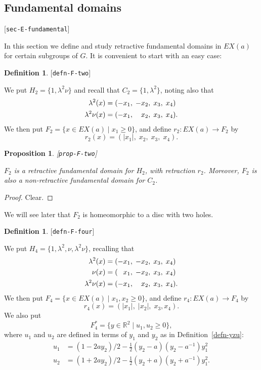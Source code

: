 \documentclass[reqno]{amsart}
\newcommand{\lbl}[1]{\label{#1}\textup{[\texttt{#1}]}\par}
\newcommand{\lbl}{\label}
\newcommand{\lm}        {\lambda}
\newcommand{\R}         {{\mathbb{R}}}
\newcommand{\st}        {\;|\;}
\newcommand{\half}      {\tfrac{1}{2}}
\newcommand{\pp}        {\hphantom{+}}
\renewcommand{\:}{\colon}
\newtheorem{proposition}[theorem]{Proposition}
\theoremstyle{definition}
\newtheorem{definition}[theorem]{Definition}
\begin{document}
\subsection{Fundamental domains}
\lbl{sec-E-fundamental}

In this section we define and study retractive fundamental domains in
$EX(a)$ for certain subgroups of $G$.  It is convenient to start with
an easy case:
\begin{definition}\lbl{defn-F-two}
 We put $H_2=\{1,\lm^2\nu\}$ and recall that $C_2=\{1,\lm^2\}$, noting
 also that
 \begin{align*}
  \lm^2(x)    &= (-x_1,\;-x_2,\;x_3,\;x_4) \\
  \lm^2\nu(x) &= (-x_1,\;\pp x_2,\;x_3,\;x_4).
 \end{align*}
 We then put $F_2=\{x\in EX(a)\st x_1\geq 0\}$, and define
 $r_2\:EX(a)\to F_2$ by
 \[ r_2(x) = (|x_1|,\;x_2,\;x_3,\;x_4). \]
\end{definition}
\begin{proposition}\lbl{prop-F-two}
 $F_2$ is a retractive fundamental domain for $H_2$, with retraction
 $r_2$.  Moreover, $F_2$ is also a non-retractive fundamental domain
 for $C_2$.
\end{proposition}
\begin{proof}
 Clear.
\end{proof}

We will see later that $F_2$ is homeomorphic to a disc with two holes.

\begin{definition}\lbl{defn-F-four}
 We put $H_4=\{1,\lm^2,\nu,\lm^2\nu\}$, recalling that
 \begin{align*}
  \lm^2(x)    &= (-x_1,\;-x_2,\;x_3,\;x_4) \\
  \nu(x)      &= (\pp x_1,\;-x_2,\;x_3,\;x_4) \\
  \lm^2\nu(x) &= (-x_1,\;\pp x_2,\;x_3,\;x_4).
 \end{align*}
 We then put $F_4=\{x\in EX(a)\st x_1,x_2\geq 0\}$, and define
 $r_4\:EX(a)\to F_4$ by
 \[ r_4(x) = (|x_1|,\;|x_2|,\;x_3,x_4). \]
 We also put
 \[ F_4^* = \{y\in\R^2\st u_1,u_2\geq 0\}, \]
 where $u_1$ and $u_2$ are defined in terms of $y_1$ and $y_2$ as in
 Definition~\ref{defn-yzu}:
 \begin{align*}
  u_1 &= (1-2ay_2)/2 - \half(y_2-a)(y_2-a^{-1})y_1^2 \\
  u_2 &= (1+2ay_2)/2 - \half(y_2+a)(y_2+a^{-1})y_1^2.
 \end{align*}
\end{definition}
\end{document}
